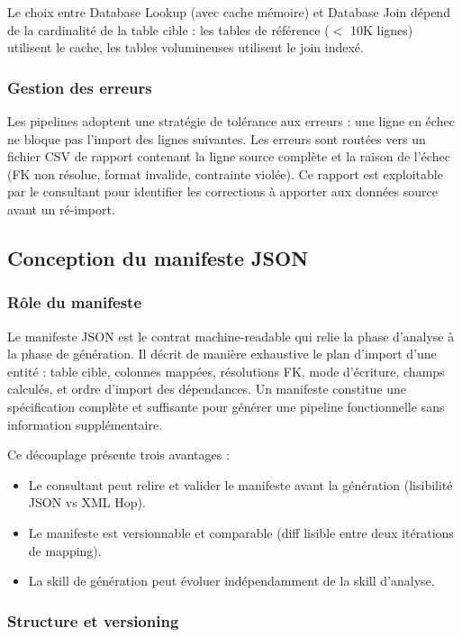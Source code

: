 \documentclass[a4paper,12pt]{article}
\begin{document}
Le choix entre Database Lookup (avec cache mémoire) et Database Join dépend de la cardinalité de la table cible : les tables de référence ($<$ 10K lignes) utilisent le cache, les tables volumineuses utilisent le join indexé.

\subsubsection{Gestion des erreurs}

Les pipelines adoptent une stratégie de tolérance aux erreurs : une ligne en échec ne bloque pas l'import des lignes suivantes. Les erreurs sont routées vers un fichier CSV de rapport contenant la ligne source complète et la raison de l'échec (FK non résolue, format invalide, contrainte violée). Ce rapport est exploitable par le consultant pour identifier les corrections à apporter aux données source avant un ré-import.

\subsection{Conception du manifeste JSON}

\subsubsection{Rôle du manifeste}

Le manifeste JSON est le contrat machine-readable qui relie la phase d'analyse à la phase de génération. Il décrit de manière exhaustive le plan d'import d'une entité : table cible, colonnes mappées, résolutions FK, mode d'écriture, champs calculés, et ordre d'import des dépendances. Un manifeste constitue une spécification complète et suffisante pour générer une pipeline fonctionnelle sans information supplémentaire.

Ce découplage présente trois avantages :
\begin{itemize}
  \item Le consultant peut relire et valider le manifeste avant la génération (lisibilité JSON vs XML Hop).
  \item Le manifeste est versionnable et comparable (diff lisible entre deux itérations de mapping).
  \item La skill de génération peut évoluer indépendamment de la skill d'analyse.
\end{itemize}

\subsubsection{Structure et versioning}
\end{document}
